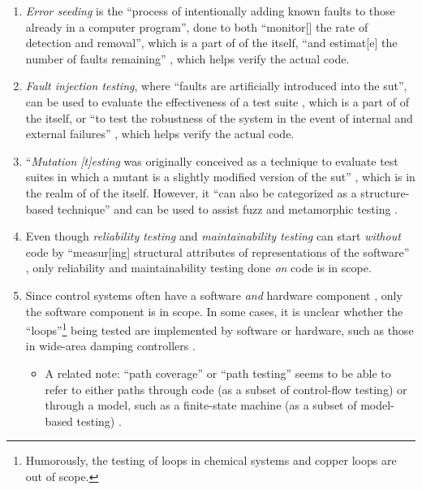 \begin{enumerate}
    \item \emph{Error seeding} is the ``process of intentionally adding
          known faults to those already in a computer program'',
          done to both ``monitor[] the rate of detection and removal'',
          which is a part of \acsVNV{} of the \acsVNV{} itself, ``and
          estimat[e] the number of faults remaining''
          \citep[p.~165]{IEEE2017}, which helps verify the actual code.
    \item \emph{Fault injection testing}, where ``faults are artificially
          introduced into the \acs{sut}'', can be used to evaluate the
          effectiveness of a test suite \citep[p.~5-18]{SWEBOK2024},
          which is a part of \acsVNV{} of the \acsVNV{} itself, or ``to test
          the robustness of the system in the event of internal and
          external failures'' \citep[p.~42]{IEEE2022}, which helps verify
          the actual code.
    \item ``\emph{Mutation [t]esting} was originally conceived as a
          technique to evaluate test suites in which a mutant is a slightly
          modified version of the \acs{sut}'' \citep[p.~5-15]{SWEBOK2024},
          which is in the realm of \acsVNV{} of the \acsVNV{} itself.
          However, it ``can also be categorized as a structure-based
          technique'' and can be used to assist fuzz and metamorphic testing
          \citep[p.~5-15]{SWEBOK2024}.
          \ifnotpaper
    \item Even though \emph{reliability testing} and \emph{maintainability
              testing} can start \emph{without} code by ``measur[ing]
          structural attributes of representations of the software''
          \citep[p.~18]{FentonAndPfleeger1997}, only reliability and
          maintainability testing done \emph{on} code is in scope.
    \item Since control systems often have a software \emph{and} hardware
          component \citep{ISO2015, PreußeEtAl2012,ForsythEtAl2004},
          only the software component is in scope. In some cases, it is
          unclear whether the ``loops''\footnote{Humorously, the testing of
              loops in chemical systems \citep{Dominguez-PumarEtAl2020} and
              copper loops \citep{Goralski1999} are out of scope.} being
          tested are implemented by software or hardware, such as those in
          wide-area damping controllers \citep{PierreEtAl2017, TrudnowskiEtAl2017}.
          \begin{itemize}
              \item A related note: ``path coverage'' or ``path testing''
                    seems to be able to refer to either paths through code
                    (as a subset of control-flow testing)
                    \citep[p.~5-13]{SWEBOK2024} or through a model, such as
                    a finite-state machine (as a subset of model-based
                    testing) \citep[p.~184]{DoğanEtAl2014}.
          \end{itemize}
          \fi
\end{enumerate}

